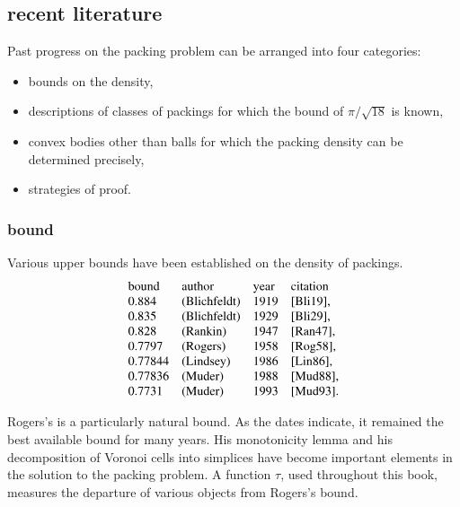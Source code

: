 \subsection{recent literature}

Past progress on the packing problem can be arranged into
four categories:
\begin{itemize}
    \item bounds on the density,
    \item descriptions of classes of packings for
which the bound of $\pi/\sqrt{18}$ is known,
    \item convex bodies other
than balls for which the packing density can be determined
precisely,
    \item strategies of proof.
\end{itemize}

\subsubsection{bound}

Various upper bounds have been established on the density of
packings.
$$
\begin{array}{llll}
\text{bound} & \text{author} & \text{year} & \text{citation} \\
  0.884 &   \text{(Blichfeldt)} & 1919 & \text{\cite{Bli19}},\\
  0.835 &   \text{(Blichfeldt)} & 1929 & \text{\cite{Bli29}},\\
  0.828 &   \text{(Rankin)} & 1947 & \text{\cite{Ran47}},\\
  0.7797 &  \text{(Rogers)} & 1958 & \text{\cite{Rog58}},\\
  0.77844 &  \text{(Lindsey)} & 1986 & \text{\cite{Lin86}},\\
  0.77836 &  \text{(Muder)} & 1988 & \text{\cite{Mud88}},\\
  0.7731 &  \text{(Muder)} & 1993 & \text{\cite{Mud93}}.\\
\end{array}
$$


\smallskip
Rogers's is a particularly natural bound.
  As the dates indicate, it remained the best available
bound for many years.  His monotonicity lemma and his
decomposition of Voronoi cells into simplices have become important
elements in the solution to the packing problem.
A function $\tau$,
used throughout this
book, measures the departure of various objects from
Rogers's bound.

